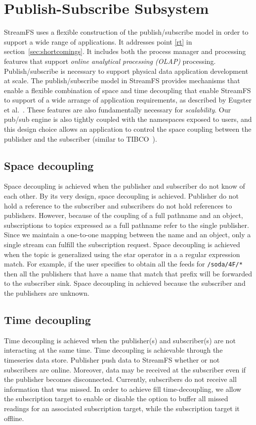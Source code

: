 \section{Publish-Subscribe Subsystem}
\label{sec:ProcMngtSchedMain}

StreamFS uses a flexible construction of the publish/subscribe model in order to support a wide range of applications.
It addresses point \ref{rt} in section~\ref{sec:shortcomings}.  It includes both the process manager and processing
features that support \emph{online analytical processing (OLAP)} processing.
Publish/subscribe is necessary to support physical data application development at scale.
The publish/subscribe model in StreamFS provides mechanisms that enable a flexible combination 
of space and time decoupling that enable StreamFS to support of a wide arrange of application requirements, as described by
Eugster et al.~\cite{eugster}.  These features are also fundamentally necessary for \emph{scalability}.
Our pub/sub engine is also tightly coupled with the namespaces exposed to users, and this design choice allows an application
to control the space coupling between the publisher and the subscriber (similar to TIBCO~\cite{tibco}).  

\subsection{Space decoupling}
Space decoupling is achieved when the publisher and subscriber do not know of each other.
By its very design, space decoupling is achieved.  Publisher do not hold a reference to the subscriber and subscribers do not
hold references to publishers.  However, because of the coupling of a full pathname and an object, subscriptions to topics
expressed as a full pathname refer to the single publisher.  Since we maintain a one-to-one mapping between the
name and an object, only a single stream can fulfill the subscription request.  Space decoupling is achieved when the 
topic is generalized using the star operator in a a regular expression match.  For example, if the user specifies
to obtain all the feeds for \texttt{/soda/4F/*} then all the publishers that have a name that match that prefix will be forwarded
to the subscriber sink.  Space decoupling in achieved because the subscriber and the publishers are unknown.

\subsection{Time decoupling}
Time decoupling is achieved when the publisher(s) and subscriber(s) are not interacting at the same time.
Time decoupling is achievable through the timeseries data store.  Publisher push data to StreamFS whether or not subscribers are
online.  Moreover, data may be received at the subscriber even if the publisher becomes disconnected.  Currently, subscribers do
not receive all information that was missed.  In order to achieve fill time-decoupling, we allow the subscription
target to enable or disable the option to buffer all missed readings for an associated subscription target, while the subscription
target it offline.

